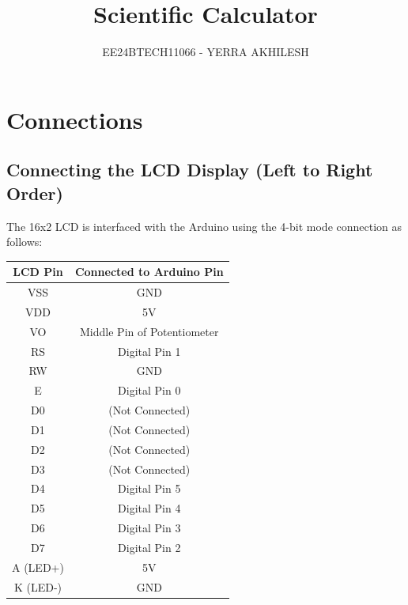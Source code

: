\documentclass[journal]{IEEEtran}
\begin{document}

\vspace{3cm}

\title{Scientific Calculator}
\author{EE24BTECH11066 - YERRA AKHILESH}
\maketitle

\renewcommand{\thefigure}{\theenumi}
\renewcommand{\thetable}{\theenumi}
\setlength{\intextsep}{10pt} %

\renewcommand{\thetable}{\theenumi}

\section{Connections}
\subsection{ Connecting the LCD Display (Left to Right Order)}

The 16x2 LCD is interfaced with the Arduino using the 4-bit mode connection as follows:

\begin{table}[h!]
\centering
\begin{tabular}{|c|c|}
\hline
\textbf{LCD Pin} & \textbf{Connected to Arduino Pin} \\
\hline
VSS & GND \\
VDD & 5V \\
VO & Middle Pin of Potentiometer \\
RS & Digital Pin 1 \\
RW & GND \\
E & Digital Pin 0 \\
D0 &  (Not Connected) \\
D1 &  (Not Connected) \\
D2 &  (Not Connected) \\
D3 &  (Not Connected) \\
D4 & Digital Pin 5 \\
D5 & Digital Pin 4 \\
D6 & Digital Pin 3 \\
D7 & Digital Pin 2 \\
A (LED+) & 5V \\
K (LED-) & GND \\
\hline
\end{tabular}
\end{table}
\end{document}
